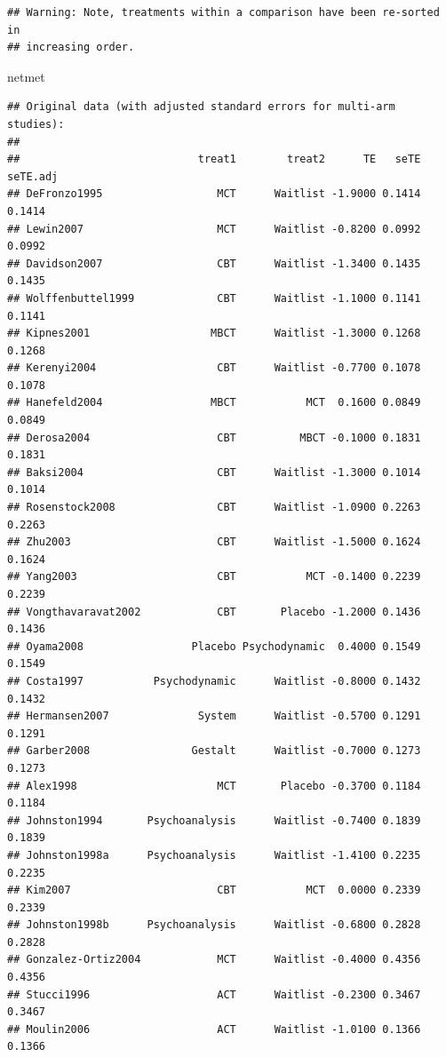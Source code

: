 \documentclass[]{book}
\newenvironment{Shaded}{\begin{snugshade}}{\end{snugshade}}
\newcommand{\NormalTok}[1]{#1}
\begin{document}
\begin{verbatim}
## Warning: Note, treatments within a comparison have been re-sorted in
## increasing order.
\end{verbatim}

\begin{Shaded}
\begin{Highlighting}[]
\NormalTok{netmet}
\end{Highlighting}
\end{Shaded}

\begin{verbatim}
## Original data (with adjusted standard errors for multi-arm studies):
## 
##                            treat1        treat2      TE   seTE seTE.adj
## DeFronzo1995                  MCT      Waitlist -1.9000 0.1414   0.1414
## Lewin2007                     MCT      Waitlist -0.8200 0.0992   0.0992
## Davidson2007                  CBT      Waitlist -1.3400 0.1435   0.1435
## Wolffenbuttel1999             CBT      Waitlist -1.1000 0.1141   0.1141
## Kipnes2001                   MBCT      Waitlist -1.3000 0.1268   0.1268
## Kerenyi2004                   CBT      Waitlist -0.7700 0.1078   0.1078
## Hanefeld2004                 MBCT           MCT  0.1600 0.0849   0.0849
## Derosa2004                    CBT          MBCT -0.1000 0.1831   0.1831
## Baksi2004                     CBT      Waitlist -1.3000 0.1014   0.1014
## Rosenstock2008                CBT      Waitlist -1.0900 0.2263   0.2263
## Zhu2003                       CBT      Waitlist -1.5000 0.1624   0.1624
## Yang2003                      CBT           MCT -0.1400 0.2239   0.2239
## Vongthavaravat2002            CBT       Placebo -1.2000 0.1436   0.1436
## Oyama2008                 Placebo Psychodynamic  0.4000 0.1549   0.1549
## Costa1997           Psychodynamic      Waitlist -0.8000 0.1432   0.1432
## Hermansen2007              System      Waitlist -0.5700 0.1291   0.1291
## Garber2008                Gestalt      Waitlist -0.7000 0.1273   0.1273
## Alex1998                      MCT       Placebo -0.3700 0.1184   0.1184
## Johnston1994       Psychoanalysis      Waitlist -0.7400 0.1839   0.1839
## Johnston1998a      Psychoanalysis      Waitlist -1.4100 0.2235   0.2235
## Kim2007                       CBT           MCT  0.0000 0.2339   0.2339
## Johnston1998b      Psychoanalysis      Waitlist -0.6800 0.2828   0.2828
## Gonzalez-Ortiz2004            MCT      Waitlist -0.4000 0.4356   0.4356
## Stucci1996                    ACT      Waitlist -0.2300 0.3467   0.3467
## Moulin2006                    ACT      Waitlist -1.0100 0.1366   0.1366

\end{verbatim}
\end{document}
